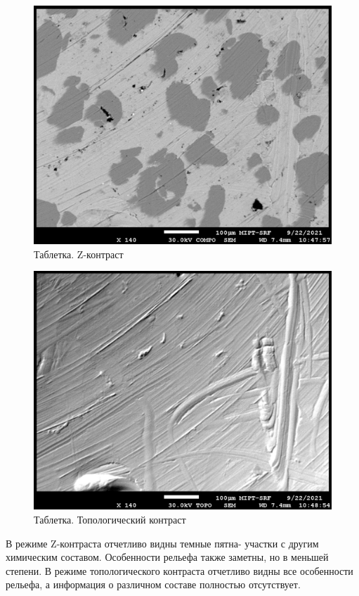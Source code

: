 \documentclass[a4paper,12pt]{article}
\theoremstyle{plain} %
\theoremstyle{definition} %
\theoremstyle{remark} %
\newcommand{\picref}[1]{
	\text{рис(\ref{#1})}
}
\begin{document}
\begin{figure}[h!]
	\centering
	\includegraphics[scale=1]{pic7.jpg}
	\caption{Таблетка. Z-контраст}
	\label{pic7}
\end{figure}
\begin{figure}[h!]
	\centering
	\includegraphics[scale=1]{pic8.jpg}
	\caption{Таблетка. Топологический контраст}
	\label{pic8}
\end{figure}

В режиме Z-контраста \picref{pic7}  отчетливо видны темные пятна- участки с другим химическим составом. Особенности рельефа также заметны, но в меньшей степени. В режиме топологического контраста \picref{pic8} отчетливо видны все особенности рельефа, а информация о различном составе полностью отсутствует.
\end{document}
